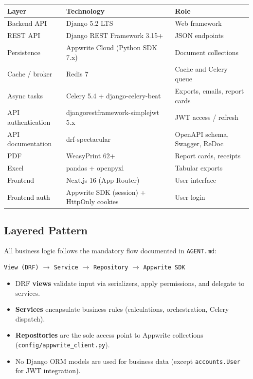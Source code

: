 \documentclass[11pt,a4paper]{article}
\begin{document}
\begin{table}[h]
\centering
\begin{tabular}{lll}
\toprule
\textbf{Layer} & \textbf{Technology} & \textbf{Role} \\
\midrule
Backend API & Django 5.2 LTS & Web framework \\
REST API & Django REST Framework 3.15+ & JSON endpoints \\
Persistence & Appwrite Cloud (Python SDK 7.x) & Document collections \\
Cache / broker & Redis 7 & Cache and Celery queue \\
Async tasks & Celery 5.4 + django-celery-beat & Exports, emails, report cards \\
API authentication & djangorestframework-simplejwt 5.x & JWT access / refresh \\
API documentation & drf-spectacular & OpenAPI schema, Swagger, ReDoc \\
PDF & WeasyPrint 62+ & Report cards, receipts \\
Excel & pandas + openpyxl & Tabular exports \\
Frontend & Next.js 16 (App Router) & User interface \\
Frontend auth & Appwrite SDK (session) + HttpOnly cookies & User login \\
\bottomrule
\end{tabular}
\end{table}

\subsection{Layered Pattern}

All business logic follows the mandatory flow documented in \texttt{AGENT.md}:

\begin{center}
\texttt{View (DRF)} $\rightarrow$ \texttt{Service} $\rightarrow$ \texttt{Repository} $\rightarrow$ \texttt{Appwrite SDK}
\end{center}

\begin{itemize}[noitemsep]
    \item DRF \textbf{views} validate input via serializers, apply permissions, and delegate to services.
    \item \textbf{Services} encapsulate business rules (calculations, orchestration, Celery dispatch).
    \item \textbf{Repositories} are the sole access point to Appwrite collections (\texttt{config/appwrite\_client.py}).
    \item No Django ORM models are used for business data (except \texttt{accounts.User} for JWT integration).
\end{itemize}
\end{document}
